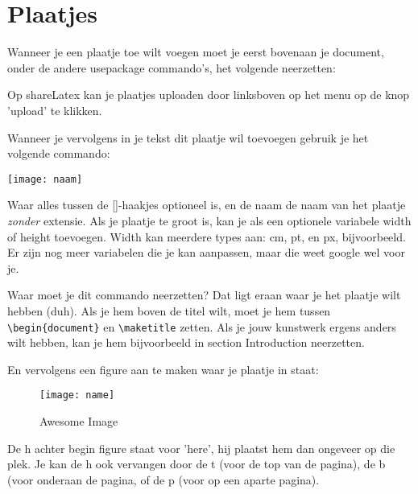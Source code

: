 \documentclass[a4paper,10pt]{article}
\begin{document}
\section{Plaatjes}
Wanneer je een plaatje toe wilt voegen moet je eerst bovenaan je document, onder de andere usepackage commando's, het volgende neerzetten:
\begin{verbbox}
\usepackage{graphicx}
\end{verbbox}
\theverbbox

Op shareLatex kan je plaatjes uploaden door linksboven op het menu op de knop 'upload' te klikken. 

Wanneer je vervolgens in je tekst dit plaatje wil toevoegen gebruik je het volgende commando: \\
\begin{verbbox}
\texttt{[image: naam]}
\end{verbbox}
\theverbbox

Waar alles tussen de []-haakjes optioneel is, en de naam de naam van het plaatje \emph{zonder} extensie. Als je plaatje te groot is, kan je als een optionele variabele width of height toevoegen. Width kan meerdere types aan: cm, pt, en px, bijvoorbeeld. Er zijn nog meer variabelen die je kan aanpassen, maar die weet google wel voor je.


Waar moet je dit commando neerzetten? Dat ligt eraan waar je het plaatje wilt hebben (duh). Als je hem boven de titel wilt, moet je hem tussen \verb| \begin{document}| en \verb|\maketitle| zetten. Als je jouw kunstwerk ergens anders wilt hebben, kan je hem bijvoorbeeld in section Introduction neerzetten. 



En vervolgens een figure aan te maken waar je plaatje in staat:\\
\begin{verbbox}
  \begin{figure}[h]
    \centering
    \texttt{[image: name]}
    \caption{Awesome Image}
    \label{fig:awesome_image}
\end{figure}
\end{verbbox}
\theverbbox

De h achter begin figure staat voor 'here', hij plaatst hem dan ongeveer op die plek. Je kan de h ook vervangen door de t (voor de top van de pagina), de b (voor onderaan de pagina, of de p (voor op een aparte pagina). 
\end{document}
